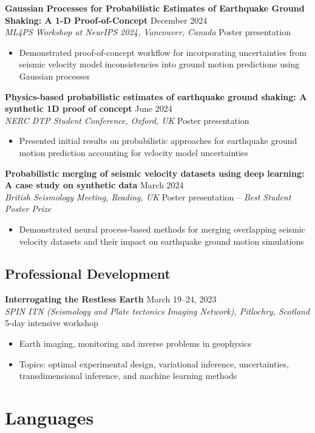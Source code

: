 \documentclass[11pt,a4paper]{article}
\newcommand{\cventry}[4]{%
    \noindent\textbf{#1} \hfill #2\\
    \textit{#3} \hfill #4\\[0.1em]
}
\begin{document}
\cventry{Gaussian Processes for Probabilistic Estimates of Earthquake Ground Shaking: A 1-D Proof-of-Concept}{December 2024}{ML4PS Workshop at NeurIPS 2024, Vancouver, Canada}{Poster presentation}
\begin{itemize}
    \item Demonstrated proof-of-concept workflow for incorporating uncertainties from seismic velocity model inconsistencies into ground motion predictions using Gaussian processes
\end{itemize}

\cventry{Physics-based probabilistic estimates of earthquake ground shaking: A synthetic 1D proof of concept}{June 2024}{NERC DTP Student Conference, Oxford, UK}{Poster presentation}
\begin{itemize}
    \item Presented initial results on probabilistic approaches for earthquake ground motion prediction accounting for velocity model uncertainties
\end{itemize}

\cventry{Probabilistic merging of seismic velocity datasets using deep learning: A case study on synthetic data}{March 2024}{British Seismology Meeting, Reading, UK}{Poster presentation -- \textit{Best Student Poster Prize}}
\begin{itemize}
    \item Demonstrated neural process-based methods for merging overlapping seismic velocity datasets and their impact on earthquake ground motion simulations
\end{itemize}

\subsection*{Professional Development}
\cventry{Interrogating the Restless Earth}{March 19--24, 2023}{SPIN ITN (Seismology and Plate tectonics Imaging Network), Pitlochry, Scotland}{5-day intensive workshop}
\begin{itemize}
    \item Earth imaging, monitoring and inverse problems in geophysics
    \item Topics: optimal experimental design, variational inference, uncertainties, transdimensional inference, and machine learning methods
\end{itemize}

\section*{Languages}
\end{document}
